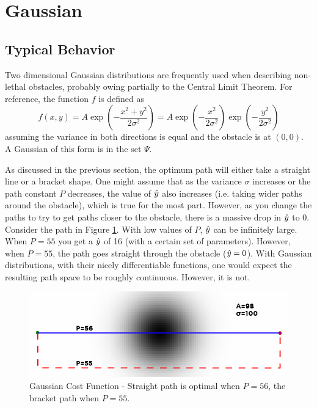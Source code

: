 \section{Gaussian}

\subsection{Typical Behavior}
Two dimensional Gaussian distributions are frequently used when describing non-lethal obstacles, probably owing partially to the Central Limit Theorem\cite{rosenblatt1956}. For reference, the function $f$ is defined as 
\[ f(x,y) = A \exp\left(- \frac{x^2+y^2}{2\sigma^2} \right) = A\exp\left(-\frac{x^2}{2\sigma^2}\right)\exp\left(-\frac{y^2}{2\sigma^2}\right) \]
assuming the variance in both directions is equal and the obstacle is at $(0,0)$. A Gaussian of this form is in the set $\Psi$. 

As discussed in the previous section, the optimum path will either take a straight line or a bracket shape. One might assume that as the variance $\sigma$ increases or the path constant $P$ decreases, the value of $\hat{y}$ also increases (i.e. taking wider paths around the obstacle), which is true for the most part. However, as you change the paths to try to get paths closer to the obstacle, there is a massive drop in $\hat{y}$ to $0$. Consider the path in Figure \ref{fig:gaussian}. With low values of $P$, $\hat{y}$ can be infinitely large. When $P=55$ you get a $\hat{y}$ of 16 (with a certain set of parameters). However, when $P=55$, the path goes straight through the obstacle ($\hat{y}=0$). With Gaussian distributions, with their nicely differentiable functions, one would expect the resulting path space to be roughly continuous. However, it is not. 

\begin{figure}
\includegraphics[width=\columnwidth]{graphix/Gaussian.png}
\caption{Gaussian Cost Function - Straight path is optimal when $P=56$, the bracket path when $P=55$. }
\label{fig:gaussian}
\end{figure}

